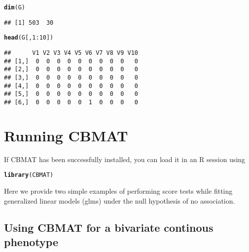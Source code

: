 \documentclass{article}\usepackage[]{graphicx}\usepackage[]{color}
\makeatletter
\newcommand{\hlnum}[1]{\textcolor[rgb]{0.686,0.059,0.569}{#1}}%
\newcommand{\hlopt}[1]{\textcolor[rgb]{0,0,0}{#1}}%
\newcommand{\hlstd}[1]{\textcolor[rgb]{0.345,0.345,0.345}{#1}}%
\newcommand{\hlkwd}[1]{\textcolor[rgb]{0.737,0.353,0.396}{\textbf{#1}}}%
\newenvironment{kframe}{%
 \def\at@end@of@kframe{}%
 \ifinner\ifhmode%
  \def\at@end@of@kframe{\end{minipage}}%
  \begin{minipage}{\columnwidth}%
 \fi\fi%
 \def\FrameCommand##1{\hskip\@totalleftmargin \hskip-\fboxsep
 \colorbox{shadecolor}{##1}\hskip-\fboxsep
     \hskip-\linewidth \hskip-\@totalleftmargin \hskip\columnwidth}%
 \MakeFramed {\advance\hsize-\width
   \@totalleftmargin\z@ \linewidth\hsize
   \@setminipage}}%
 {\par\unskip\endMakeFramed%
 \at@end@of@kframe}
\newenvironment{knitrout}{}{} %
\makeatother
\begin{document}
\begin{itemize}
\begin{knitrout}
\color{fgcolor}\begin{kframe}
\begin{alltt}
  \hlkwd{dim}\hlstd{(G)}
\end{alltt}
\begin{verbatim}
## [1] 503  30
\end{verbatim}
\begin{alltt}
  \hlkwd{head}\hlstd{(G[,}\hlnum{1}\hlopt{:}\hlnum{10}\hlstd{])}
\end{alltt}
\begin{verbatim}
##      V1 V2 V3 V4 V5 V6 V7 V8 V9 V10
## [1,]  0  0  0  0  0  0  0  0  0   0
## [2,]  0  0  0  0  0  0  0  0  0   0
## [3,]  0  0  0  0  0  0  0  0  0   0
## [4,]  0  0  0  0  0  0  0  0  0   0
## [5,]  0  0  0  0  0  0  0  0  0   0
## [6,]  0  0  0  0  0  1  0  0  0   0
\end{verbatim}
\end{kframe}
\end{knitrout}
\end{itemize}

\section{Running CBMAT}
\label{sec:Run-CBMAT}

If CBMAT has been successfully installed, you can load it in an R session using 
\begin{knitrout}
\color{fgcolor}\begin{kframe}
\begin{alltt}
  \hlkwd{library}\hlstd{(CBMAT)}
\end{alltt}
\end{kframe}
\end{knitrout}

Here we provide two simple examples of performing score tests while fitting generalized linear models (glms) under the null hypothesis of no association.

\subsection{Using CBMAT for a bivariate continous phenotype}
\label{sec:mixed}
\end{document}

